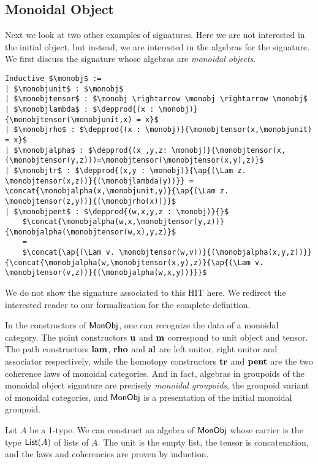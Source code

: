 \subsection{Monoidal Object}
\label{sec:monoidal_object}
Next we look at two other examples of signatures.
Here we are not interested in the initial object, but instead, we are interested in the algebras for the signature.
We first discuss the signature whose algebras are \emph{monoidal objects}.
\begin{lstlisting}[mathescape=true]
Inductive $\monobj$ :=
| $\monobjunit$ : $\monobj$
| $\monobjtensor$ : $\monobj \rightarrow \monobj \rightarrow \monobj$
| $\monobjlambda$ : $\depprod{(x : \monobj)}{\monobjtensor(\monobjunit,x) = x}$
| $\monobjrho$ : $\depprod{(x : \monobj)}{\monobjtensor(x,\monobjunit) = x}$
| $\monobjalpha$ : $\depprod{(x ,y,z: \monobj)}{\monobjtensor(x,(\monobjtensor(y,z)))=\monobjtensor(\monobjtensor(x,y),z)}$
| $\monobjtr$ : $\depprod{(x,y : \monobj)}{\ap{(\Lam z. \monobjtensor(x,z))}{(\monobjlambda(y))}} = \concat{\monobjalpha(x,\monobjunit,y)}{\ap{(\Lam z. \monobjtensor(z,y))}{(\monobjrho(x))}}$
| $\monobjpent$ : $\depprod{(w,x,y,z : \monobj)}{}$
    $\concat{\monobjalpha(w,x,\monobjtensor(y,z))}{\monobjalpha(\monobjtensor(w,x),y,z)}$
    =
    $\concat{\ap{(\Lam v. \monobjtensor(w,v))}{(\monobjalpha(x,y,z))}}{\concat{\monobjalpha(w,\monobjtensor(x,y),z)}{\ap{(\Lam v. \monobjtensor(v,z))}{(\monobjalpha(w,x,y))}}}$
\end{lstlisting}
We do not show the signature associated to this HIT here. We redirect
the interested reader to our formalization for the complete
definition.

In the constructors of $\mathsf{MonObj}$, one can recognize the data of a
monoidal category. The point constructors $\operatorname{\mathbf{u}}$ and
$\operatorname{\mathbf{m}}$ correspond to unit object and tensor. The path
constructors $\operatorname{\mathbf{lam}}$, $\operatorname{\mathbf{rho}}$ and $\operatorname{\mathbf{al}}$ are left
unitor, right unitor and associator respectively, while the homotopy constructors
$\operatorname{\mathbf{tr}}$ and $\operatorname{\mathbf{pent}}$ are the two coherence laws of
monoidal categories. And in fact, algebras in groupoids of the
monoidal object signature are precisely
\emph{monoidal groupoids}, the groupoid variant of monoidal
categories, and $\mathsf{MonObj}$ is a presentation of the initial
monoidal groupoid.

\begin{example}
Let $A$ be a 1-type.
We can construct an algebra of $\mathsf{MonObj}$ whose carrier is the type $\mathsf{List}(A)$ of lists of $A$.
The unit is the empty list, the tensor is concatenation, and the laws and coherencies are proven by induction.
\end{example}

